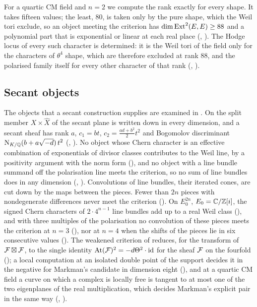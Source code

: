 For a quartic CM field and $n=2$ we compute the rank exactly for every
shape. It takes fifteen values; the least, $80$, is taken only by the pure
shape, which the Weil tori exclude, so an object meeting the criterion has
$\dim\operatorname{Ext}^{2}(E,E)\ge88$ and a polynomial part that is exponential or linear
at each real place (, ). The
Hodge locus of every such character is determined: it is the Weil tori of the
field only for the characters of $\theta^{4}$ shape, which are therefore
excluded at rank $88$, and the polarised family itself for every other
character of that rank (, ).

\subsection{Secant objects}

The objects that a secant construction supplies are examined in
. On the split member $X\times\widehat{X}$ of
\cite[Section~14]{paperI} the secant plane is written down in every dimension,
and a secant sheaf has rank $a$, $c_{1}=bt$, $c_{2}=\tfrac{ad+b^{2}}{2}t^{2}$
and Bogomolov discriminant $\mathrm{N}_{K/\mathbb{Q}}(b+a\sqrt{-d})\,t^{2}$
(\cite[Theorem~14.5]{paperI}, \cite[Theorem~14.13]{paperI}). No object whose Chern character
is an effective combination of exponentials of divisor classes contributes to
the Weil line, by a positivity argument with the norm form
(), and no object with a line bundle summand off the
polarisation line meets the criterion, so no sum of line bundles does in any
dimension (\cite[Theorem~9.20]{paperI}, ). Convolutions of line
bundles, their iterated cones, are cut down by the maps between the pieces.
Fewer than $2n$ pieces with nondegenerate differences never meet the
criterion (). On $E_{0}^{2n}$, $E_{0}=\mathbb{C}/\mathbb{Z}[i]$, the
signed Chern characters of $2\cdot4^{n-1}$ line bundles add up to a real
Weil class (), and with three multiples of the
polarisation no convolution of these pieces meets the criterion at $n=3$
(), nor at $n=4$ when the shifts of the pieces lie
in six consecutive values (). The weakened criterion
of \cite[Question~11.4]{Mar25b} reduces, for the transform of
$\mathcal{F}\boxtimes\mathcal{F}$, to the single identity
$\mathrm{At}(\mathcal{F})^{2}=-d\Theta^{2}\cdot\operatorname{id}$ for the sheaf $\mathcal{F}$ on the
fourfold (); a local computation at an isolated double point
of the support decides it in the negative for Markman's candidate in
dimension eight (), and at a quartic CM field a
curve on which a complex is locally free is tangent to at most one of the two
eigenplanes of the real multiplication, which decides Markman's explicit pair
\cite[Example~11.2.7]{Mar25c} in the same way (,
).

